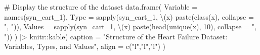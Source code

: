\documentclass[
  letterpaper,
  DIV=11,
  numbers=noendperiod]{scrartcl}
\newenvironment{Shaded}{\begin{snugshade}}{\end{snugshade}}
\newcommand{\AttributeTok}[1]{\textcolor[rgb]{0.40,0.45,0.13}{#1}}
\newcommand{\CommentTok}[1]{\textcolor[rgb]{0.37,0.37,0.37}{#1}}
\newcommand{\DecValTok}[1]{\textcolor[rgb]{0.68,0.00,0.00}{#1}}
\newcommand{\FunctionTok}[1]{\textcolor[rgb]{0.28,0.35,0.67}{#1}}
\newcommand{\NormalTok}[1]{\textcolor[rgb]{0.00,0.23,0.31}{#1}}
\newcommand{\SpecialCharTok}[1]{\textcolor[rgb]{0.37,0.37,0.37}{#1}}
\newcommand{\StringTok}[1]{\textcolor[rgb]{0.13,0.47,0.30}{#1}}
\begin{document}
\begin{Shaded}
\begin{Highlighting}[]
\CommentTok{\# Display the structure of the dataset}
\FunctionTok{data.frame}\NormalTok{(}
  \AttributeTok{Variable =} \FunctionTok{names}\NormalTok{(syn\_cart\_1),}
  \AttributeTok{Type =} \FunctionTok{sapply}\NormalTok{(syn\_cart\_1, \textbackslash{}(x) }\FunctionTok{paste}\NormalTok{(}\FunctionTok{class}\NormalTok{(x), }\AttributeTok{collapse =} \StringTok{", "}\NormalTok{)),}
  \AttributeTok{Values =} \FunctionTok{sapply}\NormalTok{(syn\_cart\_1, \textbackslash{}(x) }\FunctionTok{paste}\NormalTok{(}\FunctionTok{head}\NormalTok{(}\FunctionTok{unique}\NormalTok{(x), }\DecValTok{10}\NormalTok{), }\AttributeTok{collapse =} \StringTok{", "}\NormalTok{))}
\NormalTok{) }\SpecialCharTok{|\textgreater{}}
\NormalTok{  knitr}\SpecialCharTok{::}\FunctionTok{kable}\NormalTok{(}
    \AttributeTok{caption =} \StringTok{"Structure of the Heart Failure Dataset: Variables, Types, and Values"}\NormalTok{,}
    \AttributeTok{align =} \FunctionTok{c}\NormalTok{(}\StringTok{"l"}\NormalTok{,}\StringTok{"l"}\NormalTok{,}\StringTok{"l"}\NormalTok{)}
\NormalTok{  )}
\end{Highlighting}
\end{Shaded}
\end{document}
